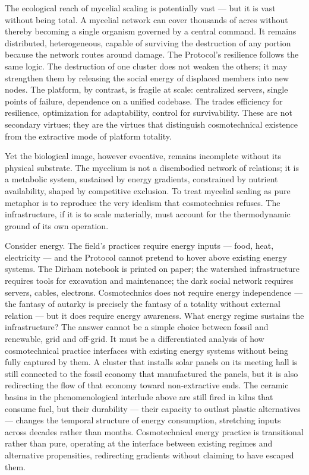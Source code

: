 The ecological reach of mycelial scaling is potentially vast — but it is vast without being total. A mycelial network can cover thousands of acres without thereby becoming a single organism governed by a central command. It remains distributed, heterogeneous, capable of surviving the destruction of any portion because the network routes around damage. The  Protocol's resilience follows the same logic. The destruction of one cluster does not weaken the others; it may strengthen them by releasing the social energy of displaced members into new nodes. The platform, by contrast, is fragile at scale: centralized servers, single points of failure, dependence on a unified codebase. The  trades efficiency for resilience, optimization for adaptability, control for survivability. These are not secondary virtues; they are the virtues that distinguish cosmotechnical existence from the extractive mode of platform totality.

Yet the biological image, however evocative, remains incomplete without its physical substrate. The mycelium is not a disembodied network of relations; it is a metabolic system, sustained by energy gradients, constrained by nutrient availability, shaped by competitive exclusion. To treat mycelial scaling as pure metaphor is to reproduce the very idealism that cosmotechnics refuses. The  infrastructure, if it is to scale materially, must account for the thermodynamic ground of its own operation.

Consider energy. The field's practices require energy inputs — food, heat, electricity — and the  Protocol cannot pretend to hover above existing energy systems. The Dirham notebook is printed on paper; the watershed infrastructure requires tools for excavation and maintenance; the dark social network requires servers, cables, electrons. Cosmotechnics does not require energy independence — the fantasy of autarky is precisely the fantasy of a totality without external relation — but it does require energy awareness. What energy regime sustains the  infrastructure? The answer cannot be a simple choice between fossil and renewable, grid and off-grid. It must be a differentiated analysis of how cosmotechnical practice interfaces with existing energy systems without being fully captured by them. A cluster that installs solar panels on its meeting hall is still connected to the fossil economy that manufactured the panels, but it is also redirecting the flow of that economy toward non-extractive ends. The ceramic basins in the phenomenological interlude above are still fired in kilns that consume fuel, but their durability — their capacity to outlast plastic alternatives — changes the temporal structure of energy consumption, stretching inputs across decades rather than months. Cosmotechnical energy practice is transitional rather than pure, operating at the interface between existing regimes and alternative propensities, redirecting gradients without claiming to have escaped them.

